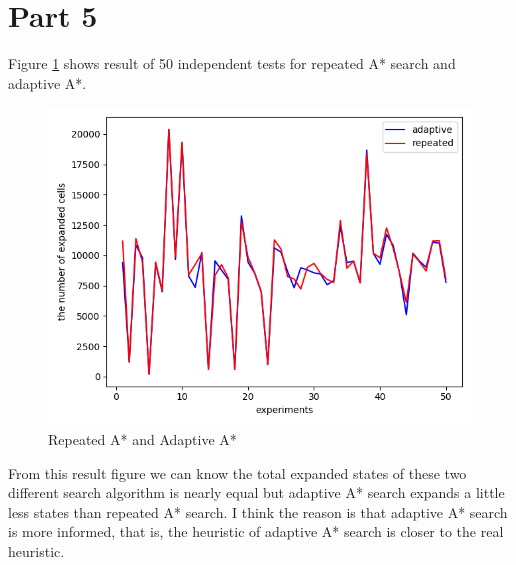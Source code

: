 \documentclass[11pt]{article}
\begin{document}
\section*{Part 5}
Figure \ref{fig:Fig5.ada} shows result of 50 independent tests for repeated A* search and adaptive A*.
\begin{figure}[htb]
	\centering
	\includegraphics[scale = 0.3]{repeated_adaptive.png}
	\caption{Repeated A* and Adaptive A*}
	\label{fig:Fig5.ada}
\end{figure}
\newline
From this result figure we can know the total expanded states of these two different search algorithm is nearly equal but adaptive A* search expands a little less states than repeated A* search. I think the reason is that adaptive A* search is more informed, that is, the heuristic of adaptive A* search is closer to the real heuristic.  




\end{document}
